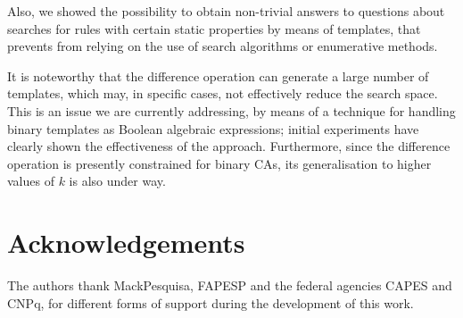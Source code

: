 \documentclass{llncs}
\begin{document}
Also, we showed the possibility to obtain non-trivial answers to questions about searches for rules with certain static properties by means of templates, that prevents from relying on the use of search algorithms or enumerative methods.

It is noteworthy that the difference operation can generate a large number of templates, which may, in specific cases, not effectively reduce the search space. This is an issue we are currently addressing, by means of a technique for handling binary templates as Boolean algebraic expressions; initial experiments have clearly shown the effectiveness of the approach. Furthermore, since the difference operation is presently constrained for binary CAs, its generalisation to higher values of $k$ is also under way.


\section*{Acknowledgements}
\label{sec:agrdecimentos}
The authors thank MackPesquisa, FAPESP and the federal agencies CAPES and CNPq, for different forms of support during the development of this work.



\end{document}
